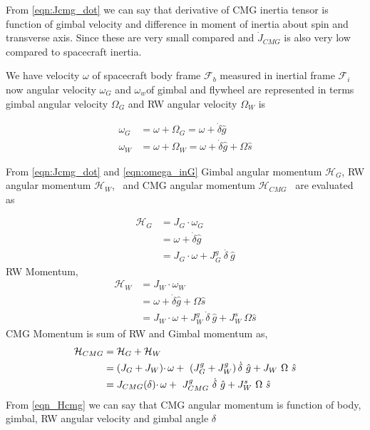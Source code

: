 From \autoref{eqn:Jcmg_dot} we can say that derivative of CMG inertia tensor is function of gimbal velocity and difference in moment of inertia about spin and transverse axis. Since these are very small compared and $\displaystyle \dot{J}_{CMG}$ is also very low compared to spacecraft inertia.

We have velocity $\displaystyle \omega $ of spacecraft body frame $\displaystyle \mathcal{F}_{b}$ measured in inertial frame $\displaystyle \mathcal{F}_{i}$ now angular velocity $\displaystyle \omega _{G}$ and $\displaystyle \omega_{w}$of gimbal and flywheel are represented in terms  gimbal angular velocity $\displaystyle \Omega_{G}$ and RW angular velocity $\displaystyle \Omega _{W}$ is


\begin{equation}
\begin{aligned}
\omega _{G} & =\omega +\Omega _{G} =\omega +\dot{\delta}\hat{g}\\
\omega _{W} & =\omega +\Omega _{W} =\omega +\dot{\delta}\hat{g} +\Omega \hat{s}
\end{aligned}
\label{eqn:omega_inG}
\end{equation}

From \autoref{eqn:Jcmg_dot} and \autoref{eqn:omega_inG} Gimbal angular momentum $\displaystyle\mathcal{H}_{G}$, RW angular momentum $\displaystyle \mathcal{H}_{W}$, \ and CMG angular momentum $\displaystyle \mathcal{H}_{CMG}$ \ are evaluated as


\begin{equation}
\begin{aligned}
\mathcal{H}_{G} & =J_{G} \cdotp \omega _{G}\\
 & =\omega +\dot{\delta}\hat{g}\\
 & =J_{G} \cdotp \omega +J^{g}_{G} \ \dot{\delta \ }\hat{g}
\end{aligned}
\end{equation}
RW Momentum,
\begin{equation}
\begin{aligned}
\mathcal{H}_{W} & =J_{W} \cdotp \omega _{W}\\
 & =\omega +\dot{\delta}\hat{g} +\Omega \hat{s}\\
 & =J_{W} \cdotp \omega +J^{g}_{W} \ \dot{\delta} \ \hat{g} +J^s_{W} \ \Omega \hat{s}
\end{aligned}
\end{equation}
CMG Momentum is sum of RW and Gimbal momentum as,
\begin{equation}
\begin{aligned}
\mathcal{H}_{CMG} & =\mathcal{H}_{G} +\mathcal{H}_{W}\\
 & =( J_{G} +J_{W}) \cdotp \omega +\ \left( J^{g}_{G} +J^{g}_{W}\right)\dot{\delta} \ \hat{g} +J_{W} \ \Omega \ \hat{s}\\
 & =J_{CMG}( \delta ) \cdotp \omega +\ J^{g}_{CMG} \ \dot{\delta} \ \hat{g} +J^s_{W} \ \Omega \ \hat{s}
\end{aligned}\\
\label{eqn_Hcmg}
\end{equation}
From \autoref{eqn_Hcmg} we can say that CMG angular momentum is function of body, gimbal, RW angular velocity and gimbal angle $\delta$

